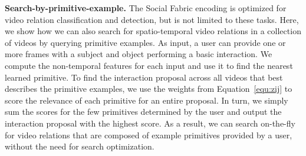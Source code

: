 \documentclass[10pt,twocolumn,letterpaper]{article}
\begin{document}
\textbf{Search-by-primitive-example.} The Social Fabric encoding is optimized for video relation classification and detection, but is not limited to these tasks. Here, we show how we can also search for spatio-temporal video relations in a collection of videos by querying primitive examples. 
As input, a user can provide one or more frames with a subject and object performing a basic interaction. We compute the non-temporal features for each input and use it to find the nearest learned primitive. To find the interaction proposal across all videos that best describes the primitive examples, we use the weights from Equation~\ref{equ:zij} to score the relevance of each primitive for an entire proposal. In turn, we simply sum the scores for the few primitives determined by the user and output the interaction proposal with the highest score. As a result, we can search on-the-fly for video relations that are composed of  example primitives provided by a user, without the need for search optimization.

\begin{table*}[t]
\centering
{}
\caption{\textbf{Benefit of multi-modal features} on VidOR. More is better. The increasing gaps indicate Social Fabric effectively captures multi-modal features for relation classification and detection.}
\label{tab:type}
\end{table*}
\end{document}
